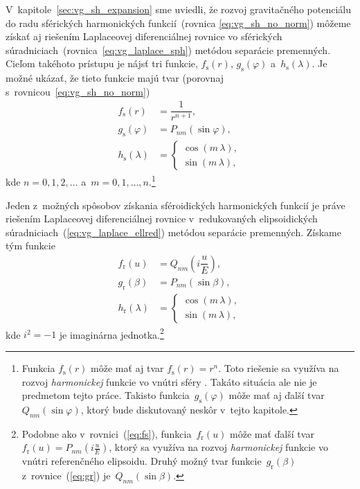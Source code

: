\documentclass[a4paper, 12pt]{book}
\begin{document}
V~kapitole~\ref{sec:vg_sh_expansion} sme uviedli, že rozvoj gravitačného 
potenciálu do radu sférických harmonických funkcií~(rovnica 
\ref{eq:vg_sh_no_norm}) môžeme získať aj riešením Laplaceovej diferenciálnej 
rovnice vo sférických súradniciach~(rovnica~\ref{eq:vg_laplace_sph}) metódou 
separácie premenných.  Cieľom takéhoto prístupu je nájsť tri funkcie, 
$f_{\mathrm{s}}(r)$, $g_{\mathrm{s}}(\varphi)$ a~$h_{\mathrm{s}}(\lambda)$.  Je 
možné ukázať, že tieto funkcie majú tvar (porovnaj 
s~rovnicou~\ref{eq:vg_sh_no_norm})
%
\begin{align}
\label{eq:fs}
f_{\mathrm{s}}(r) &= \dfrac{1}{r^{n + 1}}{,}\\
%
\label{eq:gs}
g_{\mathrm{s}}(\varphi) &= P_{nm}(\sin\varphi){,}\\
%
\label{eq:hs}
h_{\mathrm{s}}(\lambda) &=
%
\begin{cases}
\cos(m\,\lambda){,}\\
\sin(m\,\lambda){,}
\end{cases}
\end{align}
%
kde $n = 0, 1, 2, \dots$ a~$m = 0, 1, \dots, n$.\footnote{Funkcia 
$f_{\mathrm{s}}(r)$ môže mať aj tvar $f_{\mathrm{s}}(r) = r^n$.  Toto riešenie 
sa využíva na rozvoj \emph{harmonickej} funkcie vo vnútri sféry 
\parencite{MoritzPhysicalGeodesy}.  Takáto situácia ale nie je predmetom tejto 
práce.  Takisto funkcia~$g_\mathrm{s}(\varphi)$ môže mať aj ďalší 
tvar~$Q_{nm}(\sin\varphi)$, ktorý bude diskutovaný neskôr v~tejto kapitole.}

Jeden z~možných spôsobov získania sféroidických harmonických funkcií je práve 
riešením Laplaceovej diferenciálnej rovnice v~redukovaných elipsoidických 
súradniciach~(\ref{eq:vg_laplace_ellred}) metódou separácie premenných.  
Získame tým funkcie \parencite{MoritzPhysicalGeodesy}
%
\begin{align}
\label{eq:fr}
f_{\mathrm{r}}(u) &=
Q_{nm}\left( i \dfrac{u}{E} \right){,}\\
%
\label{eq:gr}
g_{\mathrm{r}}(\beta) &= P_{nm}(\sin\beta){,}\\
%
\label{eq:hr}
h_{\mathrm{r}}(\lambda) &=
%
\begin{cases}
\cos(m\,\lambda){,}\\
\sin(m\,\lambda){,}
\end{cases}
\end{align}
%
kde $i^2 = -1$ je imaginárna jednotka.\footnote{Podobne ako 
v~rovnici~(\ref{eq:fs}), funkcia~$f_{\mathrm{r}}(u)$ môže mať ďalší tvar 
$f_{\mathrm{r}}(u) = P_{nm}\left( i \frac{u}{E} \right)$, ktorý sa využíva na 
rozvoj \emph{harmonickej} funkcie vo vnútri referenčného elipsoidu.  Druhý 
možný tvar funkcie~$g_\mathrm{r}(\beta)$ z~rovnice~(\ref{eq:gr}) 
je~$Q_{nm}(\sin\beta)$.}
\end{document}
